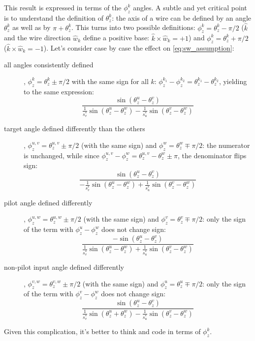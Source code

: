 \documentclass{article}
\newcommand{\ppi}{\pi}  %
\DeclareRobustCommand{\brackets}[1]{\ensuremath{\left(#1\right)}}
\begin{document}
	This result is expressed in terms of the $\phi^{k}_{z}$ angles.
	A subtle and yet critical point is to understand the definition of $\theta^{k}_{z}$:
	the axis of a wire can be defined by an angle $\theta^{k}_{z}$ as well as by $\ppi + \theta^{k}_{z}$.
	This turns into two possible definitions:
	$\phi_{z}^{k} = \theta^{k}_{z} - \pi/2$
		($\hat{k}$ and the wire direction $\hat{w}_{k}$ define a positive base: $\hat{k} \times \hat{w}_{k} = +1$)
	and $\phi_{z}^{k} = \theta^{k}_{z} + \pi/2$
		($\hat{k} \times \hat{w}_{k} = -1$).
	Let's consider case by case the effect on \cref{eq:sw_assumption}:
	\begin{description}
		\item[all angles consistently defined], $\phi_{z}^{k} = \theta^{k}_{z} \pm \pi/2$ with the same sign for all $k$: $\phi_{z}^{k_{1}} - \phi_{z}^{k_{2}} = \theta_{z}^{k_{1}} - \theta_{z}^{k_{2}}$, yielding to the same expression:
			\begin{equation*}
				\frac{\sin \brackets{\theta_{z}^{u} - \theta_{z}^{v}}}
					{\frac{1}{s^{*}_{v}} \sin \brackets{\theta_{z}^{u} - \theta_{z}^{w}} - \frac{1}{s^{*}_{u}} \sin \brackets{\theta_{z}^{v} - \theta_{z}^{w}}}
			\end{equation*}
		\item[target angle defined differently than the others], $\phi_{z}^{u,v} = \theta_{z}^{u,v} \pm \pi/2$ (with the same sign) and $\phi_{z}^{w} = \theta_{z}^{w} \mp \pi/2$: the numerator is unchanged, while since $\phi_{z}^{u,v} - \phi_{z}^{w} = \theta_{z}^{u,v} - \theta_{z}^{w} \pm \pi$, the denominator flips sign:
			\begin{equation*}
				\frac{\sin \brackets{\theta_{z}^{u} - \theta_{z}^{v}}}
					{- \frac{1}{s^{*}_{v}} \sin \brackets{\theta_{z}^{u} - \theta_{z}^{w}} + \frac{1}{s^{*}_{u}} \sin \brackets{\theta_{z}^{v} - \theta_{z}^{w}}}
			\end{equation*}
		\item[pilot angle defined differently], $\phi_{z}^{u,w} = \theta_{z}^{u,w} \pm \pi/2$ (with the same sign) and $\phi_{z}^{v} = \theta_{z}^{v} \mp \pi/2$: only the sign of the term with $\phi_{z}^{u} - \phi_{z}^{w}$ does not change sign:
			\begin{equation*}
				\frac{ - \sin \brackets{\theta_{z}^{u} - \theta_{z}^{v}}}
					{\frac{1}{s^{*}_{v}} \sin \brackets{\theta_{z}^{u} - \theta_{z}^{w}} + \frac{1}{s^{*}_{u}} \sin \brackets{\theta_{z}^{v} - \theta_{z}^{w}}}
			\end{equation*}
		\item[non-pilot input angle defined differently], $\phi_{z}^{v,w} = \theta_{z}^{v,w} \pm \pi/2$ (with the same sign) and $\phi_{z}^{u} = \theta_{z}^{u} \mp \pi/2$: only the sign of the term with $\phi_{z}^{v} - \phi_{z}^{w}$ does not change sign:
			\begin{equation*}
				\frac{\sin \brackets{\theta_{z}^{u} - \theta_{z}^{v}}}
					{\frac{1}{s^{*}_{v}} \sin \brackets{\theta_{z}^{u} + \theta_{z}^{w}} - \frac{1}{s^{*}_{u}} \sin \brackets{\theta_{z}^{v} - \theta_{z}^{w}}}
			\end{equation*}
	\end{description}
	Given this complication, it's better to think and code in terms of $\phi_{z}^{k}$.
	
\end{document}
